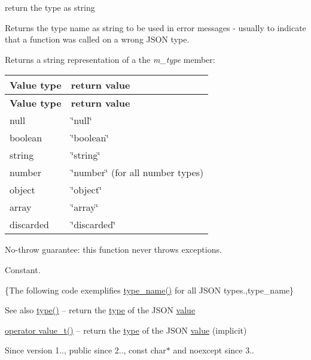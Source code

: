 return the type as string 

Returns the type name as string to be used in error messages -\/ usually to indicate that a function was called on a wrong J\+S\+ON type.

\begin{DoxyReturn}{Returns}
a string representation of a the {\itshape m\+\_\+type} member\+: \tabulinesep=1mm
\begin{longtabu} spread 0pt [c]{*{2}{|X[-1]}|}
\hline
\rowcolor{\tableheadbgcolor}\textbf{ Value type }&\textbf{ return value  }\\
\endfirsthead
\hline
\endfoot
\hline
\rowcolor{\tableheadbgcolor}\textbf{ Value type }&\textbf{ return value  }\\
\endhead
null &{\ttfamily \char`\"{}null\char`\"{}} \\
boolean &{\ttfamily \char`\"{}boolean\char`\"{}} \\
string &{\ttfamily \char`\"{}string\char`\"{}} \\
number &{\ttfamily \char`\"{}number\char`\"{}} (for all number types) \\
object &{\ttfamily \char`\"{}object\char`\"{}} \\
array &{\ttfamily \char`\"{}array\char`\"{}} \\
discarded &{\ttfamily \char`\"{}discarded\char`\"{}} \\
\end{longtabu}
No-\/throw guarantee\+: this function never throws exceptions.
\end{DoxyReturn}
Constant.

\{The following code exemplifies {\ttfamily \hyperlink{classnlohmann_1_1basic__json_a9d0a478571f82f0163b96b2424cd998f}{type\+\_\+name()}} for all J\+S\+ON types.,type\+\_\+name\}

\begin{DoxySeeAlso}{See also}
\hyperlink{classnlohmann_1_1basic__json_a2b2d781d7f2a4ee41bc0016e931cadf7}{type()} -- return the \hyperlink{classnlohmann_1_1basic__json_a2b2d781d7f2a4ee41bc0016e931cadf7}{type} of the J\+S\+ON \hyperlink{classnlohmann_1_1basic__json_adcf8ca5079f5db993820bf50036bf45d}{value} 

\hyperlink{classnlohmann_1_1basic__json_a26ef3058e249f82a04f8ec18f7419027}{operator value\+\_\+t()} -- return the \hyperlink{classnlohmann_1_1basic__json_a2b2d781d7f2a4ee41bc0016e931cadf7}{type} of the J\+S\+ON \hyperlink{classnlohmann_1_1basic__json_adcf8ca5079f5db993820bf50036bf45d}{value} (implicit)
\end{DoxySeeAlso}
\begin{DoxySince}{Since}
version 1.., public since 2.., {\ttfamily const char$\ast$} and {\ttfamily noexcept} since 3.. 
\end{DoxySince}


